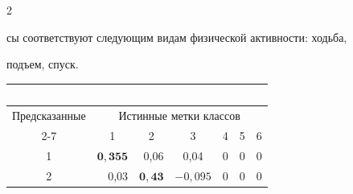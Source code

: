 \begin{multicols}{2}
 \vspace*{9pt}


 


 \noindent


 сы соответствуют следующим видам физической активности: ходьба, 


подъем, спуск.














\addtocounter{table}{1}








\begin{table}\small


\begin{center}


\parbox{348pt}{


\label{improvement}





}





\begin{tabular}{|c|r|r|c|c|c|c|}


\multicolumn{7}{c}{\ }\\[-4pt]


\hline


\multicolumn{1}{|c|}{Предсказанные}& \multicolumn{6}{c|}{Истинные метки классов}       \\ 


\cline{2-7}


\multicolumn{1}{|c|}{метки}    & \multicolumn{1}{c|}{1} & \multicolumn{1}{c|}{2} & 3 & 4 & 5 & 6\\ 


    \hline


1 & $\mathbf{0{,}355}$& 0,06\hphantom{9,} & \hphantom{$-$}0,04\hphantom{9} & 0 & 0\hphantom{,999}& 0\hphantom{9}     \\ 




2 & 0,03\hphantom{9,}   & $\mathbf{0{,}43}$\hphantom{9}   & $-0{,}095$ & 0& 0\hphantom{,999} & 0\hphantom{9} \\ 



\end{tabular}
\end{center}
\end{table}
\end{multicols}
